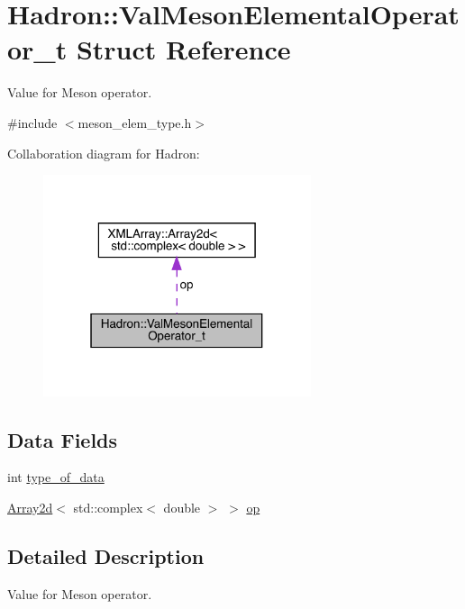 \hypertarget{structHadron_1_1ValMesonElementalOperator__t}{}\section{Hadron\+:\+:Val\+Meson\+Elemental\+Operator\+\_\+t Struct Reference}
\label{structHadron_1_1ValMesonElementalOperator__t}


Value for Meson operator.  




{\ttfamily \#include $<$meson\+\_\+elem\+\_\+type.\+h$>$}



Collaboration diagram for Hadron\+:\nopagebreak
\begin{figure}[H]
\begin{center}
\leavevmode
\includegraphics[width=223pt]{d9/d4e/structHadron_1_1ValMesonElementalOperator__t__coll__graph}
\end{center}
\end{figure}
\subsection*{Data Fields}
\begin{DoxyCompactItemize}
\item 
int \mbox{\hyperlink{structHadron_1_1ValMesonElementalOperator__t_a6d4f446ccfc0b20cb30c9c37f424ddb6}{type\+\_\+of\+\_\+data}}
\item 
\mbox{\hyperlink{classXMLArray_1_1Array2d}{Array2d}}$<$ std\+::complex$<$ double $>$ $>$ \mbox{\hyperlink{structHadron_1_1ValMesonElementalOperator__t_a4bee83a71ec09d6eea27bf327fe15742}{op}}
\end{DoxyCompactItemize}


\subsection{Detailed Description}
Value for Meson operator. 

